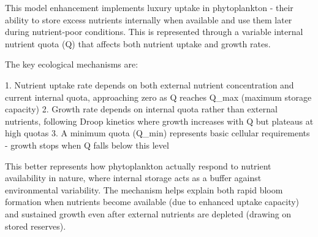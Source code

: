 This model enhancement implements luxury uptake in phytoplankton - their ability to store excess nutrients internally when available and use them later during nutrient-poor conditions. This is represented through a variable internal nutrient quota (Q) that affects both nutrient uptake and growth rates.

The key ecological mechanisms are:

1. Nutrient uptake rate depends on both external nutrient concentration and current internal quota, approaching zero as Q reaches Q_max (maximum storage capacity)
2. Growth rate depends on internal quota rather than external nutrients, following Droop kinetics where growth increases with Q but plateaus at high quotas
3. A minimum quota (Q_min) represents basic cellular requirements - growth stops when Q falls below this level

This better represents how phytoplankton actually respond to nutrient availability in nature, where internal storage acts as a buffer against environmental variability. The mechanism helps explain both rapid bloom formation when nutrients become available (due to enhanced uptake capacity) and sustained growth even after external nutrients are depleted (drawing on stored reserves).
